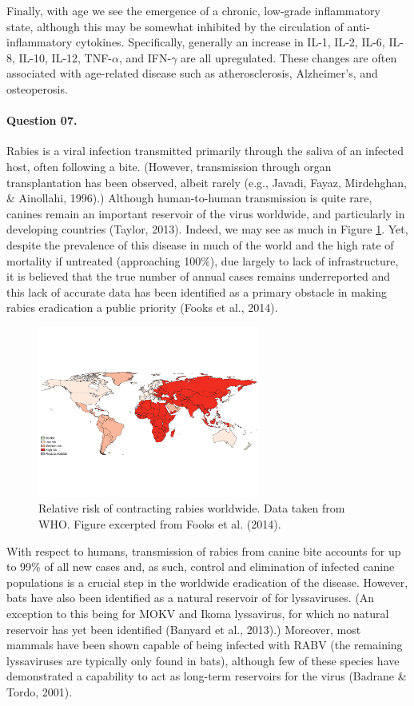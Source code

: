 \documentclass[11pt,letterpaper,final] {article}
\begin{document}
Finally, with age we see the emergence of a chronic, low-grade inflammatory state, although this may be somewhat inhibited by the circulation of anti-inflammatory cytokines. Specifically, generally an increase in IL-1, IL-2, IL-6, IL-8, IL-10, IL-12, TNF-$\alpha$, and IFN-$\gamma$ are all upregulated. These changes are often associated with age-related disease such as atherosclerosis, Alzheimer's, and osteoperosis.

\paragraph{Question 07.} Rabies is a viral infection transmitted primarily through the saliva of an infected host, often following a bite. (However, transmission through organ transplantation has been observed, albeit rarely (e.g., Javadi, Fayaz, Mirdehghan, \& Ainollahi, 1996).) Although human-to-human transmission is quite rare, canines remain an important reservoir of the virus worldwide, and particularly in developing countries (Taylor, 2013). Indeed, we may see as much in Figure \ref{fig:02}. Yet, despite the prevalence of this disease in much of the world and the high rate of mortality if untreated (approaching 100\%), due largely to lack of infrastructure, it is believed that the true number of annual cases remains underreported and this lack of accurate data has been identified as a primary obstacle in making rabies eradication a public priority (Fooks et al., 2014).

\begin{figure}[htp]
  \centering
    \includegraphics[width=0.65\textwidth]{rabies}
	\caption{Relative risk of contracting rabies worldwide. Data taken from WHO. Figure excerpted from Fooks et al. (2014).}
	\label{fig:02}
\end{figure}

With respect to humans, transmission of rabies from canine bite accounts for up to 99\% of all new cases and, as such, control and elimination of infected canine populations is a crucial step in the worldwide eradication of the disease. However, bats have also been identified as a natural reservoir of for lyssaviruses. (An exception to this being for  MOKV and Ikoma lyssavirus, for which no natural reservoir has yet been identified (Banyard et al., 2013).) Moreover, most mammals have been shown capable of being infected with RABV (the remaining lyssaviruses are typically only found in bats), although few of these species have demonstrated a capability to act as long-term reservoirs for the virus (Badrane \& Tordo, 2001).
\end{document}
